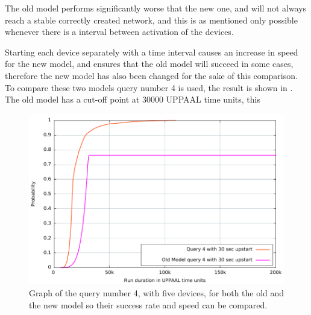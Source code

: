 \noindent
The old model performs significantly worse that the new one, and will not always reach a stable correctly created network, and this is as mentioned only possible whenever there is a interval between activation of the devices.

Starting each device separately with a time interval causes an increase in speed for the new model, and ensures that the old model will succeed in some cases, therefore the new model has also been changed for the sake of this comparison. 
To compare these two models query number 4 is used, the result is shown in .
The old model has a cut-off point at $30 000$ UPPAAL time units, this

\begin{figure}[ht]
  \includegraphics[width=1\textwidth]{Figures/Graphs/gnuplot/uppaal_Compare/graph.pdf} 
\caption{Graph of the query number 4, with five devices, for both the old and the new model so their success rate and speed can be compared.}
\label{CompareGraph}
\end{figure}

